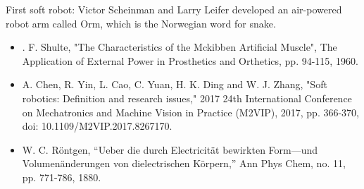 First soft robot: Victor Scheinman and Larry Leifer developed an air-powered robot arm called Orm, which is the Norwegian word for snake.

\begin{itemize}
  \item . F. Shulte, "The Characteristics of the Mckibben Artificial Muscle", The Application of External Power in Prosthetics and Orthetics, pp. 94-115, 1960.
  \item A. Chen, R. Yin, L. Cao, C. Yuan, H. K. Ding and W. J. Zhang, "Soft robotics: Definition and research issues," 2017 24th International Conference on Mechatronics and Machine Vision in Practice (M2VIP), 2017, pp. 366-370, doi: 10.1109/M2VIP.2017.8267170.
  \item  W. C. R\"{o}ntgen, “Ueber die durch Electricität bewirkten Form—und Volumenänderungen von dielectrischen Körpern,” Ann Phys Chem, no. 11, pp. 771-786, 1880.
\end{itemize}

